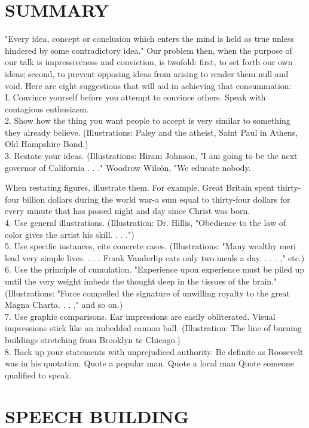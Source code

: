\documentclass[10pt]{article}
\begin{document}
\section*{SUMMARY}
"Every idea, concept or conclusion which enters the mind is held as true unless hindered by some contradictory idea." Our problem then, when the purpose of our talk is impressiveness and conviction, is twofold: first, to set forth our own ideas; second, to prevent opposing ideas from arising to render them null and void. Here are eight suggestions that will aid in achieving that consummation:\\
I. Convince yourself before you attempt to convince others. Speak with contagious enthusiasm.\\
2. Show how the thing you want people to accept is very similar to something they already believe. (Illustrations: Paley and the atheist, Saint Paul in Athens, Old Hampshire Bond.)\\
3. Restate your ideas. (Illustrations: Hiram Johnson, "I am going to be the next governor of California . . ." Woodrow Wilsón, "We educate nobody.

When restating figures, illustrate them. For example, Great Britain spent thirty-four billion dollars during the world war-a sum equal to thirty-four dollars for every minute that has passed night and day since Christ was born.\\
4. Use general illustrations. (Illustration: Dr. Hillis, "Obedience to the law of color gives the artist his skill. . . .")\\
5. Use specific instances, cite concrete cases. (Illustrations: "Many wealthy meri lead very simple lives. . . . Frank Vanderlip eats only two meals a day. . . . ," etc.)\\
6. Use the principle of cumulation. "Experience upon experience must be piled up until the very weight imbeds the thought deep in the tissues of the brain." (Illustrations: "Force compelled the signature of unwilling royalty to the great Magna Charta. . . ," and so on.)\\
7. Use graphic comparisons. Ear impressions are easily obliterated. Visual impressions stick like an imbedded cannon ball. (Illustration: The line of burning buildings stretching from Brooklyn tc Chicago.)\\
8. Back up your statements with unprejudiced authority. Be definite as Roosevelt was in his quotation. Quote a popular man. Quote a local man Quote someone qualified to speak.

\section*{SPEECH BUILDING}
\end{document}
